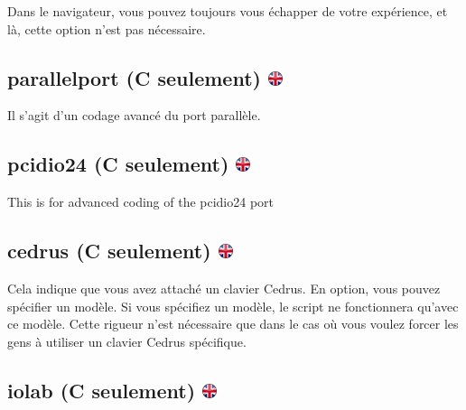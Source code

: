 \documentclass[
]{book}
\begin{document}
Dans le navigateur, vous pouvez toujours vous échapper de votre
expérience, et là, cette option n'est pas nécessaire.

\hypertarget{parallelport-c-seulement}{%
\subsection[parallelport (C seulement) ]{\texorpdfstring{parallelport (C
seulement)
\href{https://www.psytoolkit.org/doc3.2.0/syntax.html\#options-parallelport}{\protect\includegraphics{img/ukflag.png}}}{parallelport (C seulement) }}\label{parallelport-c-seulement}}

Il s'agit d'un codage avancé du port parallèle.

\hypertarget{pcidio24-c-seulement}{%
\subsection[pcidio24 (C seulement) ]{\texorpdfstring{pcidio24 (C
seulement)
\href{https://www.psytoolkit.org/doc3.2.0/syntax.html\#options-pcidio24}{\protect\includegraphics{img/ukflag.png}}}{pcidio24 (C seulement) }}\label{pcidio24-c-seulement}}

This is for advanced coding of the pcidio24 port

\hypertarget{cedrus-c-seulement}{%
\subsection[cedrus (C seulement) ]{\texorpdfstring{cedrus (C seulement)
\href{https://www.psytoolkit.org/doc3.2.0/syntax.html\#options-cedrus}{\protect\includegraphics{img/ukflag.png}}}{cedrus (C seulement) }}\label{cedrus-c-seulement}}

Cela indique que vous avez attaché un clavier Cedrus. En option, vous
pouvez spécifier un modèle. Si vous spécifiez un modèle, le script ne
fonctionnera qu'avec ce modèle. Cette rigueur n'est nécessaire que dans
le cas où vous voulez forcer les gens à utiliser un clavier Cedrus
spécifique.

\hypertarget{iolab-c-seulement}{%
\subsection[iolab (C seulement) ]{\texorpdfstring{iolab (C seulement)
\href{https://www.psytoolkit.org/doc3.2.0/syntax.html\#options-iolab}{\protect\includegraphics{img/ukflag.png}}}{iolab (C seulement) }}\label{iolab-c-seulement}}
\end{document}

